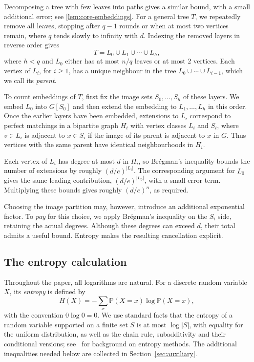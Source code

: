 \documentclass[reqno,final,a4paper]{amsart}
\numberwithin{equation}{section}
\theoremstyle{definition}
\theoremstyle{remark}
\begin{document}
Decomposing a tree with few leaves into paths gives a similar bound, with a small additional error; see \cref{lem:core-embeddings}. For a general tree $T$, we repeatedly remove all leaves, stopping after
$q-1$ rounds or when at most two vertices remain, where $q$ tends
slowly to infinity with $d$. Indexing the removed layers in reverse order gives
\[
    T=L_0\cup L_1\cup\cdots\cup L_h,
\]
where $h<q$ and $L_0$ either has at most $n/q$ leaves or at most $2$ vertices. Each vertex of $L_i$, for $i\geq 1$, has a unique neighbour in the tree $L_0\cup\cdots\cup L_{i-1}$, which we call its \textit{parent}.


To count embeddings of $T$, first fix the image sets $S_0,\ldots,S_h$ of these layers. We embed $L_0$ into $G[S_0]$ and then extend the embedding to $L_1,\ldots,L_h$ in this order. Once the earlier layers have been embedded, extensions to $L_i$ correspond to perfect matchings in a bipartite graph $H_i$ with vertex classes $L_i$ and $S_i$, where $v\in L_i$ is adjacent to $x\in S_i$ if the image of its parent is adjacent to $x$ in $G$. Thus vertices with the same parent have identical neighbourhoods in $H_i$.

Each vertex of $L_i$ has degree at most $d$ in $H_i$, so Br\'egman's inequality bounds the number of extensions by roughly $(d/e)^{|L_i|}$. The corresponding argument for $L_0$ gives the same leading contribution, $(d/e)^{|L_0|}$, with a small error term. Multiplying these bounds gives roughly $(d/e)^n$, as required.

Choosing the image partition may, however, introduce an additional exponential factor. To \emph{pay} for this choice, we apply Brégman’s inequality on the $S_i$ side, retaining the actual degrees. Although these degrees can exceed $d$, their total admits a useful bound. Entropy makes the resulting cancellation explicit.

\subsection{The entropy calculation}
Throughout the paper, all logarithms are natural. For a discrete random variable $X$, its \emph{entropy} is defined by
\[
    H(X)=-\sum_x \mathbb P(X=x)\log\mathbb P(X=x),
\]
with the convention $0\log 0=0$. We use standard facts that the entropy of a random variable supported on a finite set $S$ is at most $\log |S|$, with equality for the uniform distribution, as well as the chain rule, subadditivity and their conditional versions; see~\cite{SamotijEntropy} for background on entropy methods. The additional inequalities needed below are collected in Section~\ref{sec:auxiliary}. 
\end{document}
